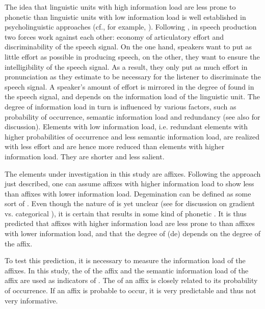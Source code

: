 The idea that linguistic units with high information load are less prone to phonetic  than linguistic units with low information load is well established in psycholinguistic approaches  (cf., for example, \citealt{Aylett.2004,Kuperman.2007,Pluymaekers.2010,Hanique.2012}). Following \cite{Lindblom.1990}, in speech production two forces work against each other: economy of articulatory effort and discriminability of the speech signal. On the one hand, speakers want to put as little effort as possible in producing speech, on the other, they want to ensure the intelligibility of the speech signal. As a result, they only put as much effort in pronunciation as they estimate to be necessary for the listener to discriminate the speech signal. A speaker's amount of effort is mirrored in the degree of  found in the speech signal, and depends on the information load of the linguistic unit. The degree of information load in turn is influenced by various factors, such as probability of occurrence, semantic information load and redundancy (see also \cite{Kuperman.2007} for discussion).  
Elements with low information load, i.e. redundant elements with higher probabilities of occurrence and less semantic information load, are realized with less effort and are hence more reduced than elements with higher information load. They are shorter and less salient. 

The elements under investigation in this study are affixes. Following the approach just described, one can assume affixes with higher information load to show less  than affixes with lower information load. Degemination can be defined as some sort of . Even though the nature of  is yet unclear (see  for discussion on gradient vs. categorical ), it is certain that  results in some kind of phonetic . It is thus predicted that affixes with higher information load are less prone to  than affixes with lower information load, and that the degree of (de) depends on the degree  of the affix.

To test this prediction, it is necessary to measure the information load of the affixes.
 In this study, the  of the affix and the semantic information load of the affix are used as indicators of .
The  of an affix is closely related to its probability of occurrence. 
 If an affix is probable to occur, it is very predictable and thus not very informative. %

